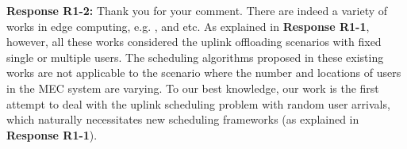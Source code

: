 \documentclass[12pt,onecolumn]{IEEEtran}
\newcommand{\blue}{\color{blue}}
\newcommand{\spaceblank}{\vskip 4mm}
\begin{document}
\spaceblank
{}	
\spaceblank
{\blue \textbf{Response R1-2:} Thank you for your comment. There are indeed a variety of works in edge computing, e.g. \cite{You2015SingleUserWPT,you2016multiuser,chen2015decentalizedgame,chen2016gametheorymec,huang2012dynamic,mao2016dynamicmec,mao2016power-delay,Wang2019JointMEC}, and etc. As explained in \textbf{Response R1-1}, however, all these works considered the uplink offloading scenarios with fixed single or multiple users. The scheduling algorithms proposed in these existing works are not applicable to the scenario where the number and locations of users in the MEC system are varying. To our best knowledge, our work is the first attempt to deal with the uplink scheduling problem with random user arrivals, which naturally necessitates new scheduling frameworks (as explained in \textbf{Response R1-1}).
}


\spaceblank
{}
\end{document}
